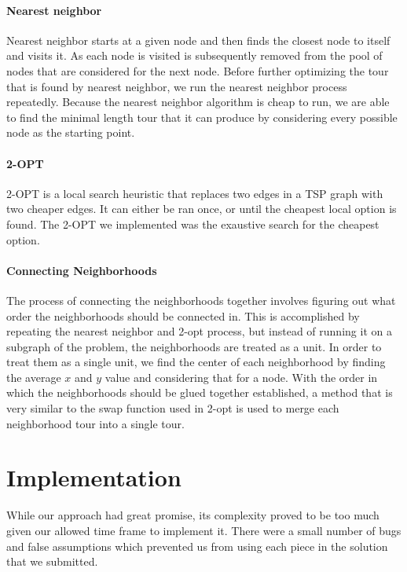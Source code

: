 \documentclass[12pt]{article}
\begin{document}
\paragraph{Nearest neighbor}

Nearest neighbor starts at a given node and then finds the closest node to
itself and visits it. As each node is visited is subsequently removed from the
pool of nodes that are considered for the next node. Before further optimizing
the tour that is found by nearest neighbor, we run the nearest neighbor process
repeatedly. Because the nearest neighbor algorithm is cheap to run, we are able
to find the minimal length tour that it can produce by considering every
possible node as the starting point. 

\paragraph{2-OPT}

2-OPT is a local search heuristic that replaces two edges in a TSP graph
with two cheaper edges. It can either be ran once, or until the cheapest
local option is found. The 2-OPT we implemented was the exaustive search
for the cheapest option.

\paragraph{Connecting Neighborhoods}

The process of connecting the neighborhoods together involves figuring out what
order the neighborhoods should be connected in. This is accomplished by
repeating the nearest neighbor and 2-opt process, but instead of running it on
a subgraph of the problem, the neighborhoods are treated as a unit.  In order
to treat them as a single unit, we find the center of each neighborhood by
finding the average $x$ and $y$ value and considering that for a node.  With
the order in which the neighborhoods should be glued together established, a
method that is very similar to the swap function used in 2-opt is used to merge
each neighborhood tour into a single tour.


\section*{Implementation}

While our approach had great promise, its complexity proved to be too much
given our allowed time frame to implement it.  There were a small number of
bugs and false assumptions which prevented us from using each piece in the
solution that we submitted.
\end{document}
